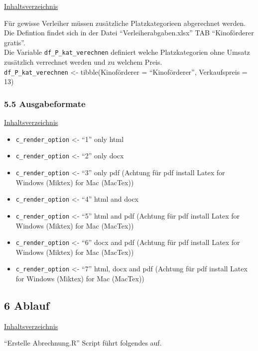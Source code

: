 \documentclass[
]{article}
\providecommand{\tightlist}{%
  \setlength{\itemsep}{0pt}\setlength{\parskip}{0pt}}
\begin{document}
\hyperref[Inhaltsverzeichnis]{Inhaltsverzeichnis}

Für gewisse Verleiher müssen zusätzliche Platzkategorieen abgerechnet
werden. Die Defintion findet sich in der Datei ``Verleiherabgaben.xlsx''
TAB ``Kinoförderer gratis''.\\
Die Variable \texttt{df\_P\_kat\_verechnen} definiert welche
Platzkategorien ohne Umsatz zusätzlich verrechnet werden und zu welchem
Preis.\\
\texttt{df\_P\_kat\_verechnen} \textless- tibble(Kinoförderer =
``Kinoförderer'', Verkaufspreis = 13) ~

\subsubsection{5.5 Ausgabeformate}\label{ausgabeformate}

\hyperref[Inhaltsverzeichnis]{Inhaltsverzeichnis}

\begin{itemize}
\tightlist
\item
  \texttt{c\_render\_option} \textless- ``1'' only html
\item
  \texttt{c\_render\_option} \textless- ``2'' only docx
\item
  \texttt{c\_render\_option} \textless- ``3'' only pdf (Achtung für pdf
  install Latex for Windows (Miktex) for Mac (MacTex))
\item
  \texttt{c\_render\_option} \textless- ``4'' html and docx
\item
  \texttt{c\_render\_option} \textless- ``5'' html and pdf (Achtung für
  pdf install Latex for Windows (Miktex) for Mac (MacTex))
\item
  \texttt{c\_render\_option} \textless- ``6'' docx and pdf (Achtung für
  pdf install Latex for Windows (Miktex) for Mac (MacTex))
\item
  \texttt{c\_render\_option} \textless- ``7'' html, docx and pdf
  (Achtung für pdf install Latex for Windows (Miktex) for Mac (MacTex))
\end{itemize}

\newpage

\subsection{6 Ablauf}\label{ablauf}

\hyperref[Inhaltsverzeichnis]{Inhaltsverzeichnis}

``Erstelle Abrechnung.R'' Script führt folgendes auf.
\end{document}

